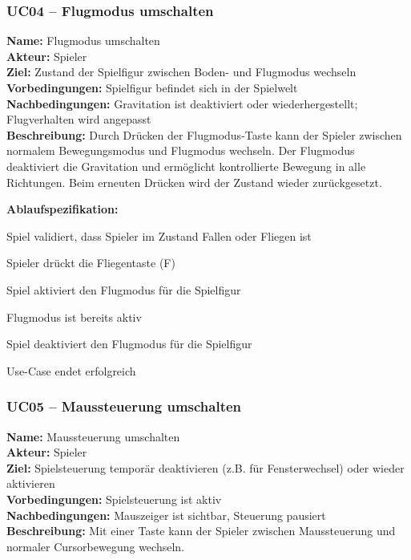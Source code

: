 \documentclass{article}
\begin{document}
\newpage

\subsubsection*{UC04 – Flugmodus umschalten}

\textbf{Name:} Flugmodus umschalten \\
\textbf{Akteur:} Spieler \\
\textbf{Ziel:} Zustand der Spielfigur zwischen Boden- und Flugmodus wechseln \\
\textbf{Vorbedingungen:} Spielfigur befindet sich in der Spielwelt \\
\textbf{Nachbedingungen:} Gravitation ist deaktiviert oder wiederhergestellt; Flugverhalten wird angepasst \\
\textbf{Beschreibung:} Durch Drücken der Flugmodus-Taste kann der Spieler zwischen normalem Bewegungsmodus und Flugmodus wechseln. Der Flugmodus deaktiviert die Gravitation und ermöglicht kontrollierte Bewegung in alle Richtungen. Beim erneuten Drücken wird der Zustand wieder zurückgesetzt.

\textbf{Ablaufspezifikation:}
\begin{description}[style=nextline,leftmargin=1.9cm,labelwidth=1.6cm]
  \item[1.] Spiel validiert, dass Spieler im Zustand Fallen oder Fliegen ist
  \item[2.] Spieler drückt die Fliegentaste (F)
  \item[3.] Spiel aktiviert den Flugmodus für die Spielfigur
  \item[3a.] Flugmodus ist bereits aktiv
  \item[3a.1.] Spiel deaktiviert den Flugmodus für die Spielfigur
  \item[4.] Use-Case endet erfolgreich
\end{description}

\newpage

\subsubsection*{UC05 – Maussteuerung umschalten}

\textbf{Name:} Maussteuerung umschalten \\
\textbf{Akteur:} Spieler \\
\textbf{Ziel:} Spielsteuerung temporär deaktivieren (z.B. für Fensterwechsel) oder wieder aktivieren\\
\textbf{Vorbedingungen:} Spielsteuerung ist aktiv \\
\textbf{Nachbedingungen:} Mauszeiger ist sichtbar, Steuerung pausiert \\
\textbf{Beschreibung:} Mit einer Taste kann der Spieler zwischen Maussteuerung und normaler Cursorbewegung wechseln.
\end{document}
